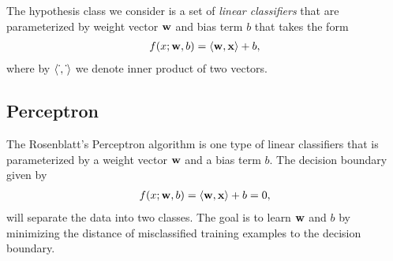 The hypothesis class we consider is a set of \textit{linear classifiers} that are parameterized by weight vector $\mathbf {w}$ and bias term $b$ that takes the form
\begin{align}
	f(x;\mathbf {w},b) = \langle \mathbf {w}, \mathbf {x} \rangle + b, \label{linearclassifier}
\end{align}
where by $\langle \dot\,, \dot\, \rangle$ we denote inner product of two vectors.





\subsection{Perceptron}

The Rosenblatt's Perceptron algorithm \citep{Rosenblatt58,Rosenblatt62} is one type of linear classifiers that is parameterized by a weight vector $\mathbf {w}$ and a bias term $b$. 
The decision boundary given by 
\begin{align*}
	f(x;\mathbf {w},b) = \langle \mathbf {w}, \mathbf {x} \rangle + b =0,
\end{align*}
will separate the data into two classes.
The goal is to learn $\mathbf {w}$ and $b$ by minimizing the distance of misclassified training examples to the decision boundary.

